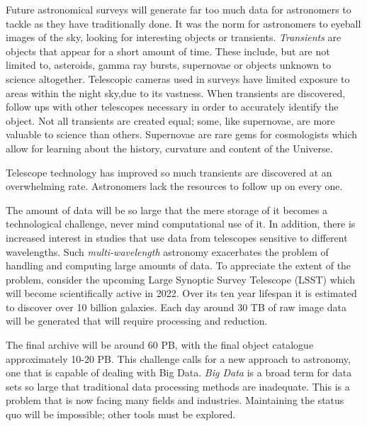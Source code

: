 Future astronomical surveys will generate far too much data for astronomers to tackle as they have traditionally done.
It was the norm for astronomers to eyeball images of the sky, looking for interesting objects or transients.
\textit{Transients} are objects that appear for a short amount of time.
These include, but are not limited to, asteroids, gamma ray bursts, supernovae or objects unknown to science altogether.
Telescopic cameras used in surveys have limited exposure to areas within the night sky,due to its vastness.
When transients are discovered, follow ups with other telescopes necessary in order to accurately identify the object.
Not all transients are created equal; some, like supernovae, are more valuable to science than others.
Supernovae are rare gems for cosmologists which allow for learning about the history, curvature and content of the Universe.

Telescope technology has improved so much transients are discovered at an overwhelming rate.
Astronomers lack the resources to follow up on every one.

The amount of data will be so large that the mere storage of it becomes a technological challenge, never mind computational use of it.
In addition, there is increased interest in studies that use data from telescopes sensitive to different wavelengths.
Such \textit{multi-wavelength} astronomy exacerbates the problem of handling and computing large amounts of data.
To appreciate the extent of the problem, consider the upcoming Large Synoptic Survey Telescope (LSST) which will become scientifically active in 2022\citep{abell2009lsst}.
Over its ten year lifespan it is estimated to discover over 10 billion galaxies.
Each day around 30 TB of raw image data will be generated that will require processing and reduction\citep{kantor2005lsst}.

The final archive will be around 60 PB, with the final object catalogue approximately 10-20 PB\citep{borne2007machine}.
This challenge calls for a new approach to astronomy, one that is capable of dealing with Big Data.
\textit{Big Data} is a broad term for data sets so large that traditional data processing methods are inadequate.
This is a problem that is now facing many fields and industries.
Maintaining the status quo will be impossible; other tools must be explored.


